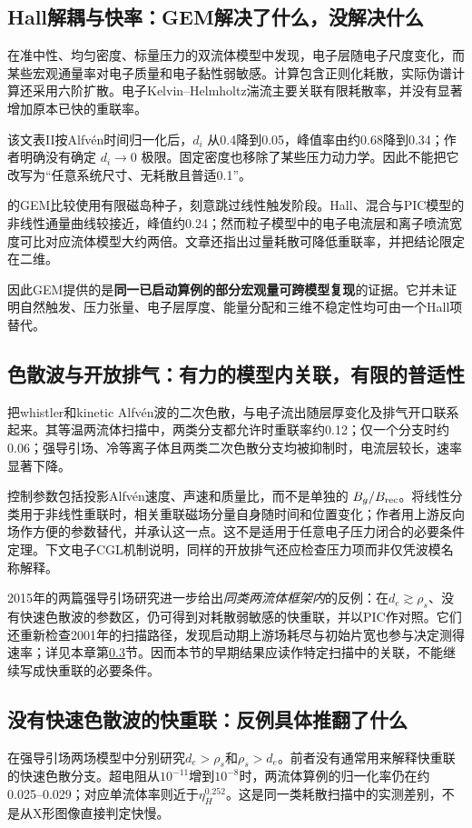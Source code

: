 \documentclass[UTF8,a4paper,11pt,openany,fontset=fandol]{ctexbook}
\begin{document}
\subsection{Hall解耦与快率：GEM解决了什么，没解决什么}
\citet{Biskamp1997}在准中性、均匀密度、标量压力的双流体模型中发现，电子层随电子尺度变化，而某些宏观通量率对电子质量和电子黏性弱敏感。计算包含正则化耗散，实际伪谱计算还采用六阶扩散。电子Kelvin--Helmholtz湍流主要关联有限耗散率，并没有显著增加原本已快的重联率。

该文表II按Alfvén时间归一化后，$d_i$ 从0.4降到0.05，峰值率由约0.68降到0.34；作者明确没有确定 $d_i\to0$ 极限。固定密度也移除了某些压力动力学。因此不能把它改写为“任意系统尺寸、无耗散且普适0.1”。

\citet{Birn2001}的GEM比较使用有限磁岛种子，刻意跳过线性触发阶段。Hall、混合与PIC模型的非线性通量曲线较接近，峰值约0.24；然而粒子模型中的电子电流层和离子喷流宽度可比对应流体模型大约两倍。文章还指出过量耗散可降低重联率，并把结论限定在二维。

因此GEM提供的是\textbf{同一已启动算例的部分宏观量可跨模型复现}的证据。它并未证明自然触发、压力张量、电子层厚度、能量分配和三维不稳定性均可由一个Hall项替代。

\subsection{色散波与开放排气：有力的模型内关联，有限的普适性}
\citet{Rogers2001}把whistler和kinetic Alfvén波的二次色散，与电子流出随层厚变化及排气开口联系起来。其等温两流体扫描中，两类分支都允许时重联率约0.12；仅一个分支时约0.06；强导引场、冷等离子体且两类二次色散分支均被抑制时，电流层较长，速率显著下降。

控制参数包括投影Alfvén速度、声速和质量比，而不是单独的 $B_g/B_{\rm rec}$。将线性分类用于非线性重联时，相关重联磁场分量自身随时间和位置变化；作者用上游反向场作方便的参数替代，并承认这一点。这不是适用于任意电子压力闭合的必要条件定理。下文电子CGL机制说明，同样的开放排气还应检查压力项而非仅凭波模名称解释。

2015年的两篇强导引场研究进一步给出\emph{同类两流体框架内}的反例：在$d_e\gtrsim\rho_s$、没有快速色散波的参数区，仍可得到对耗散弱敏感的快重联，并以PIC作对照。它们还重新检查2001年的扫描路径，发现启动期上游场耗尽与初始片宽也参与决定测得速率；详见本章第\ref{sec:withoutfdw}节。因而本节的早期结果应读作特定扫描中的关联，不能继续写成快重联的必要条件。\citep{L216,L217}

\subsection{没有快速色散波的快重联：反例具体推翻了什么}\label{sec:withoutfdw}
\citet{L216}在强导引场两场模型中分别研究$d_e>\rho_s$和$\rho_s>d_e$。前者没有通常用来解释快重联的快速色散分支。超电阻从$10^{-11}$增到$10^{-8}$时，两流体算例的归一化率仍在约0.025--0.029；对应单流体率则近于$\eta_H^{0.252}$。这是同一类耗散扫描中的实测差别，不是从X形图像直接判定快慢。
\end{document}
